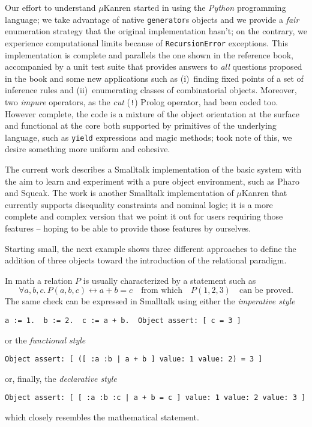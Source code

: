 Our effort to understand $\mu$Kanren started in \citep{Nocentini:kanrens} using
the \emph{Python} programming language; we take advantage of native
\Verb|generator|s objects and we provide a \emph{fair} enumeration strategy
that the original implementation hasn't; on the contrary, we experience
computational limits because of \texttt{RecursionError} exceptions. This
implementation is complete and parallels the one shown in the reference book,
accompanied by a unit test suite that provides answers to \emph{all} questions
proposed in the book and some new applications such as (i)~finding fixed points
of a set of inference rules and (ii)~enumerating classes of combinatorial
objects. Moreover, two \textit{impure} operators, as the \textit{cut}
(\Verb|!|) Prolog operator, had been coded too. However complete, the code is a
mixture of the object orientation at the surface and functional at the core both
supported by primitives of the underlying language, such as \Verb|yield|
expressions and magic methods; took note of this, we desire something more
uniform and cohesive.

The current work describes a Smalltalk implementation of the basic system with
the aim to learn and experiment with a pure object environment, such as Pharo
and Squeak. The work \citep{evan:smallkanren} is another Smalltalk
implementation of $\mu$Kanren that currently supports disequality constraints
and nominal logic; it is a more complete and complex version that we point it
out for users requiring those features -- hoping to be able to provide those
features by ourselves.

Starting small, the next example shows three different
approaches to define the addition of three  objects toward 
the introduction of the relational paradigm.
\begin{example}
In math a relation $P$ is usually characterized by a statement such as
\begin{displaymath}
\forall a,b,c.\,P(a,b,c) \leftrightarrow a + b = c \quad\text{from which}\quad
P(1,2,3) \quad\text{can be proved.}
\end{displaymath}
The same check can be expressed in Smalltalk using either the
\textit{imperative style}
\begin{verbatim}
a := 1.  b := 2.  c := a + b.  Object assert: [ c = 3 ]
\end{verbatim}
or the \textit{functional style}
\begin{verbatim}
Object assert: [ ([ :a :b | a + b ] value: 1 value: 2) = 3 ]
\end{verbatim}
or, finally, the \textit{declarative style}
\begin{verbatim}
Object assert: [ [ :a :b :c | a + b = c ] value: 1 value: 2 value: 3 ]
\end{verbatim}
which closely resembles the mathematical statement.
\end{example}
